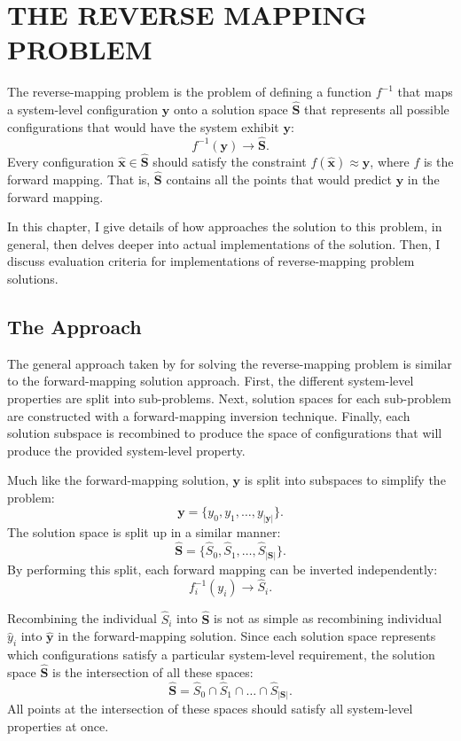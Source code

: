 \chapter{THE REVERSE MAPPING PROBLEM}
\thispagestyle{plain}

\label{ReverseMapping}

The reverse-mapping problem is the problem of defining a function $f^{-1}$ that maps a system-level configuration $\mathbf y$ onto a solution space $\hat{\mathbf S}$ that represents all possible configurations that would have the system exhibit $\mathbf y$:
   \[ f^{-1}(\mathbf y) \rightarrow \hat{\mathbf S}. \]
Every configuration $\hat {\mathbf x} \in \hat {\mathbf S}$ should satisfy the constraint $f(\hat{\mathbf x}) \approx \mathbf y$, where $f$ is the forward mapping.
That is, $\hat{\mathbf S}$ contains all the points that would predict $\mathbf y$ in the forward mapping.

In this chapter, I give details of how \fw approaches the solution to this problem, in general, then delves deeper into actual implementations of the solution.
Then, I discuss evaluation criteria for implementations of reverse-mapping problem solutions.

\section{The \fw Approach}

The general approach taken by \fw for solving the reverse-mapping problem is similar to the \fw forward-mapping solution approach.
First, the different system-level properties are split into sub-problems.
Next, solution spaces for each sub-problem are constructed with a forward-mapping inversion technique.
Finally, each solution subspace is recombined to produce the space of configurations that will produce the provided system-level property.

Much like the forward-mapping solution, $\mathbf y$ is split into subspaces to simplify the problem:
\[ \mathbf y = \{y_0, y_1, \ldots, y_{|\mathbf y|}\}. \]
The solution space is split up in a similar manner:
\[ \hat{\mathbf S} = \{\hat S_0, \hat S_1, \ldots, \hat S_{|\mathbf S|}\}. \]
By performing this split, each forward mapping can be inverted independently:
\[ f^{-1}_i(y_i) \rightarrow \hat S_i. \]

Recombining the individual $\hat S_i$ into $\hat{\mathbf S}$ is not as simple as recombining individual $\hat y_i$ into $\hat{\mathbf y}$ in the forward-mapping solution.
Since each solution space represents which configurations satisfy a particular system-level requirement, the solution space $\hat{\mathbf S}$ is the intersection of all these spaces:
\[ \hat{\mathbf S} = \hat S_0 \cap \hat S_1 \cap \ldots \cap \hat S_{|\mathbf S|}.\]
All points at the intersection of these spaces should satisfy all system-level properties at once.

